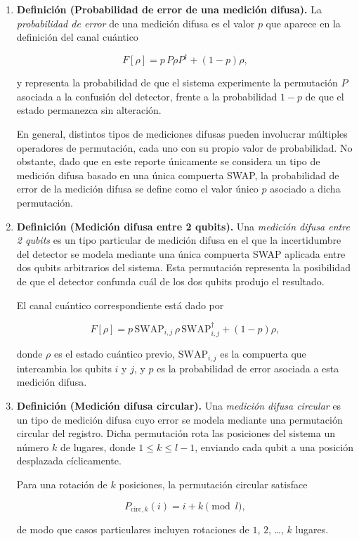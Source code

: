 \documentclass[letterpaper]{article}
\begin{document}
\begin{enumerate}
\item\textbf{Definición (Probabilidad de error de una medición difusa).} La \emph{probabilidad de error} de una medición difusa es el valor $p$ que aparece en la definición del canal cuántico

\[
F[\rho] = p\, P\rho P^\dagger + (1-p)\rho,
\]

y representa la probabilidad de que el sistema experimente la permutación $P$ asociada a la confusión del detector, frente a la probabilidad $1-p$ de que el estado permanezca sin alteración.

En general, distintos tipos de mediciones difusas pueden involucrar múltiples operadores de permutación, cada uno con su propio valor de probabilidad. No obstante, dado que en este reporte únicamente se considera un tipo de medición difusa basado en una única compuerta SWAP, la probabilidad de error de la medición difusa se define como el valor único $p$ asociado a dicha permutación.

\item\textbf{Definición (Medición difusa entre 2 qubits).}
Una \emph{medición difusa entre 2 qubits} es un tipo particular de medición difusa en el que la incertidumbre del detector se modela mediante una única compuerta SWAP aplicada entre dos qubits arbitrarios del sistema. Esta permutación representa la posibilidad de que el detector confunda cuál de los dos qubits produjo el resultado.

El canal cuántico correspondiente está dado por

\[
F[\rho] = p\, \mathrm{SWAP}_{i,j}\, \rho\, \mathrm{SWAP}_{i,j}^\dagger + (1-p)\rho,
\]

donde $\rho$ es el estado cuántico previo, $\mathrm{SWAP}_{i,j}$ es la compuerta que intercambia los qubits $i$ y $j$, y $p$ es la probabilidad de error asociada a esta medición difusa.

\item \textbf{Definición (Medición difusa circular).}
Una \emph{medición difusa circular} es un tipo de medición difusa cuyo error se modela mediante una permutación circular del registro. Dicha permutación rota las posiciones del sistema un número $k$ de lugares, donde $1 \le k \le l-1$, enviando cada qubit a una posición desplazada cíclicamente.

Para una rotación de $k$ posiciones, la permutación circular satisface

\[
P_{\mathrm{circ},k}(i) = i+k \pmod{l},
\]

de modo que casos particulares incluyen rotaciones de $1$, $2$, \ldots, $k$ lugares.


\end{enumerate}
\end{document}
